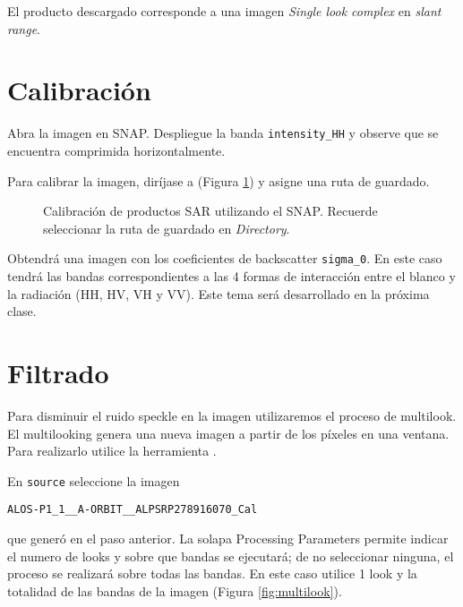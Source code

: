 El producto descargado corresponde a una imagen \emph{Single look complex} en \emph{slant range}.

\section{Calibración}

Abra la imagen  en SNAP. Despliegue la banda \texttt{intensity\_HH} y observe que se encuentra comprimida horizontalmente.

Para calibrar la imagen, diríjase a  (Figura \ref{fig:calibrar}) y asigne una ruta de guardado.

 \begin{figure}[h!]
     \centering
     \hspace{1cm}
     \caption{Calibración de productos SAR utilizando el SNAP. Recuerde seleccionar la ruta de guardado en \emph{Directory}.} %
     \label{fig:calibrar}
 \end{figure}

 Obtendrá una imagen con los coeficientes de backscatter \texttt{sigma\_0}. En este caso tendrá las bandas correspondientes a las 4 formas de interacción entre el blanco y la radiación (HH, HV, VH y VV). Este tema será desarrollado en la próxima clase.

 \section{Filtrado}

 Para disminuir el ruido speckle en la imagen utilizaremos el proceso de multilook. El multilooking genera una nueva imagen a partir de los píxeles en una ventana. Para realizarlo utilice la herramienta .

 En \texttt{source} seleccione la imagen
 \begin{center} \texttt{ALOS-P1\_1\_\_A-ORBIT\_\_ALPSRP278916070\_Cal} \end{center}
 que generó en el paso anterior. La solapa Processing Parameters permite indicar el numero de looks y sobre que bandas se ejecutará; de no seleccionar ninguna, el proceso se realizará sobre todas las bandas. En este caso utilice 1 look y la totalidad de las bandas de la imagen (Figura \ref{fig:multilook}).

